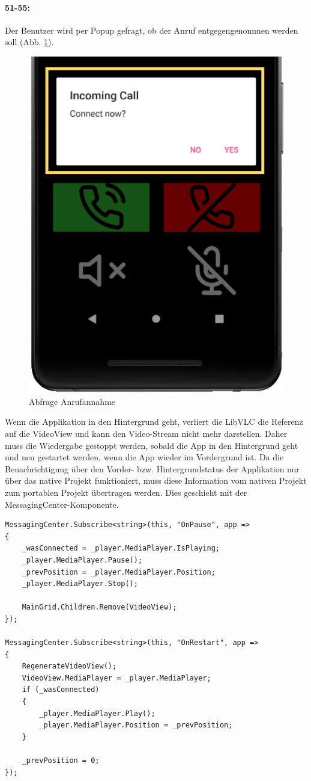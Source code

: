 \paragraph{51-55:} Der Benutzer wird per Popup gefragt, ob der Anruf entgegengenommen werden soll (Abb. \ref{fig:inc-call}).
\begin{figure}
    \centering
    \includegraphics[width=.5\linewidth]{images/xamarin/IncomingCall.png}
    \caption{Abfrage Anrufannahme}
    \label{fig:inc-call}
\end{figure}
Wenn die Applikation in den Hintergrund geht, verliert die LibVLC die Referenz auf die VideoView und kann den Video-Stream nicht mehr darstellen.
Daher muss die Wiedergabe gestoppt werden, sobald die App in den Hintergrund geht und neu gestartet werden, wenn die App wieder im Vordergrund ist.
Da die Benachrichtigung über den Vorder- bzw. Hintergrundstatus der Applikation nur über das native Projekt funktioniert, muss diese Information vom nativen Projekt zum portablen Projekt übertragen werden.
Dies geschieht mit der MessagingCenter-Komponente.
\begin{verbatim}
MessagingCenter.Subscribe<string>(this, "OnPause", app =>
{
    _wasConnected = _player.MediaPlayer.IsPlaying;
    _player.MediaPlayer.Pause();
    _prevPosition = _player.MediaPlayer.Position;
    _player.MediaPlayer.Stop();

    MainGrid.Children.Remove(VideoView);
});

MessagingCenter.Subscribe<string>(this, "OnRestart", app =>
{
    RegenerateVideoView();
    VideoView.MediaPlayer = _player.MediaPlayer;
    if (_wasConnected)
    {
        _player.MediaPlayer.Play();
        _player.MediaPlayer.Position = _prevPosition;
    }

    _prevPosition = 0;
});
\end{verbatim}
